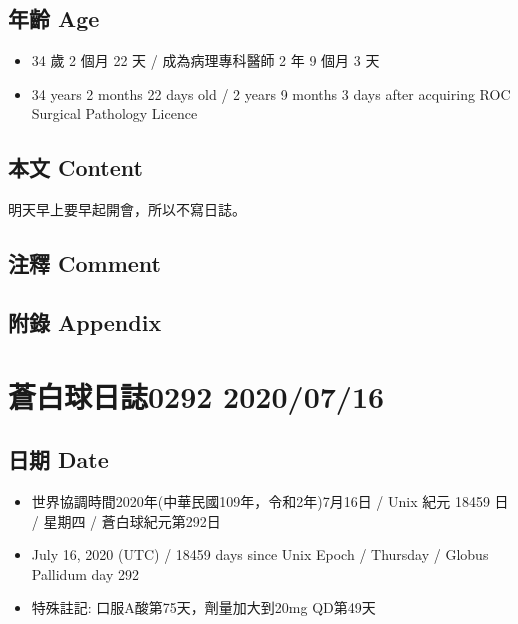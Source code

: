 \documentclass[
]{article}
\providecommand{\tightlist}{%
  \setlength{\itemsep}{0pt}\setlength{\parskip}{0pt}}
\begin{document}
\hypertarget{ux5e74ux9f61-age-13}{%
\subsection{年齡 Age}\label{ux5e74ux9f61-age-13}}

\begin{itemize}
\tightlist
\item
  34 歲 2 個月 22 天 / 成為病理專科醫師 2 年 9 個月 3 天
\item
  34 years 2 months 22 days old / 2 years 9 months 3 days after
  acquiring ROC Surgical Pathology Licence
\end{itemize}

\hypertarget{ux672cux6587-content-13}{%
\subsection{本文 Content}\label{ux672cux6587-content-13}}

明天早上要早起開會，所以不寫日誌。

\hypertarget{ux6ce8ux91cb-comment-13}{%
\subsection{注釋 Comment}\label{ux6ce8ux91cb-comment-13}}

\hypertarget{ux9644ux9304-appendix-13}{%
\subsection{附錄 Appendix}\label{ux9644ux9304-appendix-13}}

\hypertarget{ux84bcux767dux7403ux65e5ux8a8c0292-20200716}{%
\section{蒼白球日誌0292
2020/07/16}\label{ux84bcux767dux7403ux65e5ux8a8c0292-20200716}}

\hypertarget{ux65e5ux671f-date-14}{%
\subsection{日期 Date}\label{ux65e5ux671f-date-14}}

\begin{itemize}
\tightlist
\item
  世界協調時間2020年(中華民國109年，令和2年)7月16日 / Unix 紀元 18459 日
  / 星期四 / 蒼白球紀元第292日
\item
  July 16, 2020 (UTC) / 18459 days since Unix Epoch / Thursday / Globus
  Pallidum day 292
\item
  特殊註記: 口服A酸第75天，劑量加大到20mg QD第49天
\end{itemize}
\end{document}
